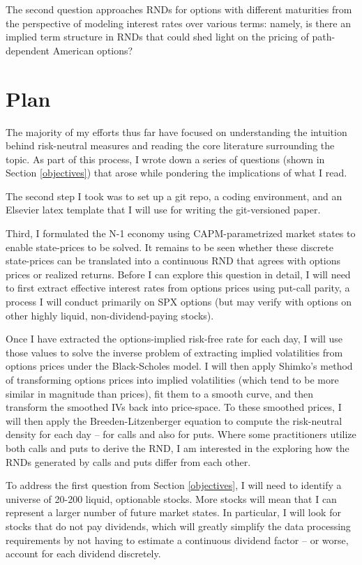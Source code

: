 \documentclass[final,3p,times,authoryear]{elsarticle}
\begin{document}
  The second question approaches RNDs for options with different maturities from the perspective of modeling interest rates over various terms: namely, is there an implied term structure in RNDs that could shed light on the pricing of path-dependent American options?


\section{Plan}
  \label{plan}
  The majority of my efforts thus far have focused on understanding the intuition behind risk-neutral measures and reading the core literature surrounding the topic. As part of this process, I wrote down a series of questions (shown in Section \ref{objectives}) that arose while pondering the implications of what I read.

  The second step I took was to set up a git repo, a coding environment, and an Elsevier latex template that I will use for writing the git-versioned paper.

  Third, I formulated the N-1 economy using CAPM-parametrized market states to enable state-prices to be solved. It remains to be seen whether these discrete state-prices can be translated into a continuous RND that agrees with options prices or realized returns. Before I can explore this question in detail, I will need to first extract effective interest rates from options prices using put-call parity, a process I will conduct primarily on SPX options (but may verify with options on other highly liquid, non-dividend-paying stocks).

  Once I have extracted the options-implied risk-free rate for each day, I will use those values to solve the inverse problem of extracting implied volatilities from options prices under the Black-Scholes model. I will then apply Shimko's method \citep{shimko_bounds_1993} of transforming options prices into implied volatilities (which tend to be more similar in magnitude than prices), fit them to a smooth curve, and then transform the smoothed IVs back into price-space. To these smoothed prices, I will then apply the Breeden-Litzenberger \citep{breeden_prices_1978} equation to compute the risk-neutral density for each day -- for calls and also for puts. Where some practitioners utilize both calls and puts to derive the RND, I am interested in the exploring how the RNDs generated by calls and puts differ from each other.

  To address the first question from Section \ref{objectives}, I will need to identify a universe of 20-200 liquid, optionable stocks. More stocks will mean that I can represent a larger number of future market states. In particular, I will look for stocks that do not pay dividends, which will greatly simplify the data processing requirements by not having to estimate a continuous dividend factor -- or worse, account for each dividend discretely.
\end{document}
